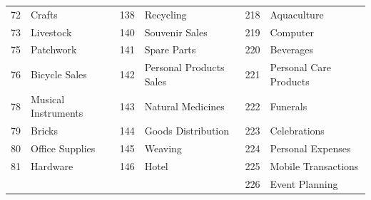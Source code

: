 \begin{longtable}[]{|r|l|r|l|r|l|}
	72          & Crafts                & 138         & Recycling                 & 218         & Aquaculture                \\
	73          & Livestock             & 140         & Souvenir Sales            & 219         & Computer                   \\
	75          & Patchwork             & 141         & Spare Parts               & 220         & Beverages                  \\
	76          & Bicycle Sales         & 142         & Personal Products Sales   & 221         & Personal Care
	Products                                                                                                                 \\
	78          & Musical Instruments   & 143         & Natural Medicines         & 222         & Funerals                   \\
	79          & Bricks                & 144         & Goods Distribution        & 223         & Celebrations               \\
	80          & Office Supplies       & 145         & Weaving                   & 224         & Personal Expenses          \\
	81          & Hardware              & 146         & Hotel                     & 225         & Mobile Transactions        \\
	            &                       &             &                           & 226         & Event Planning             \\
\end{longtable}


